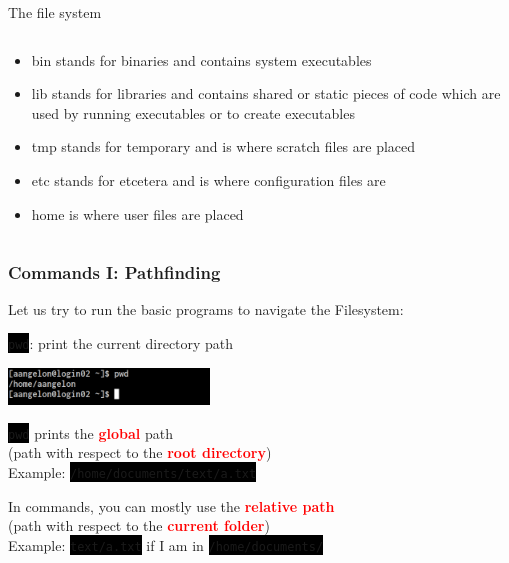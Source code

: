 \documentclass[unknownkeysallowed, 10pt, a4 paper, handout]{beamer}
\newcommand{\focus}[1]{\textbf{\textcolor{red}{#1}}}
\newcommand{\code}[1]{\colorbox{black}{\color{green}\texttt{#1}}}
\begin{document}
\begin{frame}[label=filesystem]{The file system}
\begin{columns}[T]
\begin{column}{.73\textwidth}
{\begin{itemize}
        \item bin stands for binaries and contains system executables
        \item lib stands for libraries and contains shared or static pieces of
          code which are used by running executables or to create executables
        \item tmp stands for temporary and is where scratch files are placed
        \item etc stands for etcetera and is where configuration files are
        \item home is where user files are placed
      \end{itemize}
    }
    \end{column}
  \end{columns}
\end{frame}


\begin{frame}[c]
  \frametitle{Commands I: Pathfinding}
  Let us try to run the basic programs to navigate the Filesystem:
  \begin{center}
    \vspace{2pt}

    \code{pwd}: print the current directory path
    \vspace{-4mm}

    \begin{center}
      \includegraphics[width=0.40\textwidth]{pics/pwd.png}
    \end{center}
    \vspace{4mm}

    \code{pwd} prints the \focus{global} path\\
    (path with respect to the \focus{root directory})\\
    Example: \code{/home/documents/text/a.txt}
    \vspace{4mm}

    In commands, you can mostly use the \focus{relative path}\\
    (path with respect to the \focus{current folder})\\
    Example: \code{text/a.txt} if I am in \code{/home/documents/}
  \end{center}
\end{frame}
\end{document}
